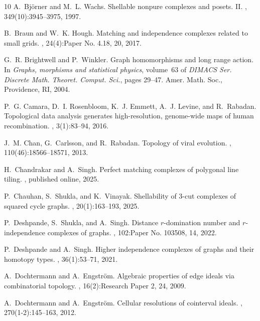\documentclass[11pt,reqno,a4paper]{amsart}
\theoremstyle{definition}
\theoremstyle{theorem}
\theoremstyle{remark}
\begin{document}
\begin{thebibliography}{10}
	A.~Bj\"orner and M.~L. Wachs.
	\newblock Shellable nonpure complexes and posets. {II}.
	, 349(10):3945--3975, 1997.
	
	B.~Braun and W.~K. Hough.
	\newblock Matching and independence complexes related to small grids.
	, 24(4):Paper No. 4.18, 20, 2017.
	
	G.~R. Brightwell and P.~Winkler.
	\newblock Graph homomorphisms and long range action.
	\newblock In {\em Graphs, morphisms and statistical physics}, volume~63 of {\em
		DIMACS Ser. Discrete Math. Theoret. Comput. Sci.}, pages 29--47. Amer. Math.
	Soc., Providence, RI, 2004.
	
	P.~G. Camara, D.~I. Rosenbloom, K.~J. Emmett, A.~J. Levine, and R.~Rabadan.
	\newblock Topological data analysis generates high-resolution, genome-wide maps
	of human recombination.
	, 3(1):83--94, 2016.
	
	J.~M. Chan, G.~Carlsson, and R.~Rabadan.
	\newblock Topology of viral evolution.
	, 110(46):18566--18571, 2013.
	
	H.~Chandrakar and A.~Singh.
	\newblock Perfect matching complexes of polygonal line tiling.
	, published online, 2025.
	
	P.~Chauhan, S.~Shukla, and K.~Vinayak.
	\newblock Shellability of 3-cut complexes of squared cycle graphs.
	, 20(1):163--193,
	2025.
	
	P.~Deshpande, S.~Shukla, and A.~Singh.
	\newblock Distance {$r$}-domination number and {$r$}-independence complexes of
	graphs.
	, 102:Paper No. 103508, 14, 2022.
	
	P.~Deshpande and A.~Singh.
	\newblock Higher independence complexes of graphs and their homotopy types.
	, 36(1):53--71, 2021.
	
	A.~Dochtermann and A.~Engstr\"om.
	\newblock Algebraic properties of edge ideals via combinatorial topology.
	, 16(2):Research Paper 2, 24, 2009.
	
	A.~Dochtermann and A.~Engstr\"om.
	\newblock Cellular resolutions of cointerval ideals.
	, 270(1-2):145--163, 2012.
	

\end{thebibliography}
\end{document}
